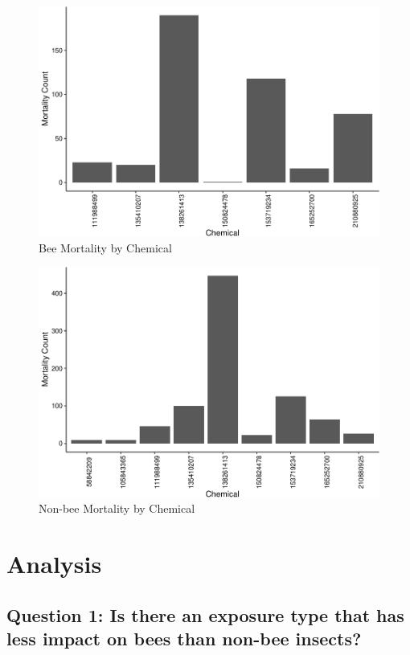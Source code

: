 \documentclass[
  12pt,
]{article}
\begin{document}
\begin{figure}
\centering
\includegraphics{SamEdit_UpdatedwithModel_files/figure-latex/unnamed-chunk-9-1.pdf}
\caption{Bee Mortality by Chemical}
\end{figure}

\begin{figure}
\centering
\includegraphics{SamEdit_UpdatedwithModel_files/figure-latex/unnamed-chunk-10-1.pdf}
\caption{Non-bee Mortality by Chemical}
\end{figure}

\newpage

\hypertarget{analysis}{%
\section{Analysis}\label{analysis}}

\hypertarget{question-1-is-there-an-exposure-type-that-has-less-impact-on-bees-than-non-bee-insects}{%
\subsection{Question 1: Is there an exposure type that has less impact
on bees than non-bee
insects?}\label{question-1-is-there-an-exposure-type-that-has-less-impact-on-bees-than-non-bee-insects}}
\end{document}
